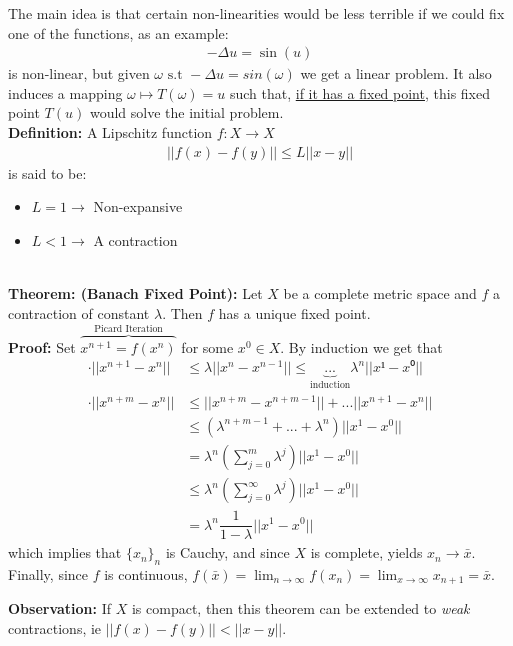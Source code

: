 The main idea is that certain non-linearities would be less terrible if we could fix one of the functions, as an example:
\begin{align}
    -\Delta u = \sin (u)
\end{align}
is non-linear, but given $\omega \text{ s.t } -\Delta u = sin(\omega)$ we get a linear problem. It also induces a mapping $\omega \mapsto T(\omega) = u$ such that, \underline{if it has a fixed point}, this fixed point $T(u)$ would solve the initial problem. \\


\textbf{Definition:} A Lipschitz function $f:X\to X$
\begin{align*}
    ||f(x)-f(y)||\leq L||x-y||
\end{align*}
is said to be:
\begin{itemize}
    \item $L = 1\to$ Non-expansive
    \item $L<1 \to$ A contraction
\end{itemize}\\

\textbf{Theorem: (Banach Fixed Point):} Let $X$ be a complete metric space and $f$ a contraction of constant $\lambda$. Then $f$ has a unique fixed point.\\

 

\textbf{Proof:} Set $\overbrace{x^{n+1}=f(x^n)}^{\text{Picard Iteration}}$ for some $x^0\in X$. By induction we get that
\begin{align*}
    \cdot ||x^{n+1}-x^n|| &\leq \lambda ||x^n-x^{n-1}||\leq \underbrace{...}_\text{induction} \lambda^n||x¹-x⁰||\\
    \cdot || x^{n+m}-x^n|| &\leq ||x^{n+m}-x^{n+m-1}||+ ... ||x^{n+1}-x^n||\\
    &\leq (\lambda ^{n+m-1}+...+\lambda^n)||x^1-x^0||\\
    &=\lambda^n\left(\displaystyle\sum_{j=0}^m\lambda^j\right)||x^1-x^0||\\
    &\leq\lambda^n\left(\displaystyle\sum_{j=0}^\infty\lambda^j\right)||x^1-x^0||\\
    &=\lambda^n\dfrac{1}{1-\lambda}||x^1-x^0||
\end{align*}
which implies that $\{x_n\}_n$ is Cauchy, and since $X$ is complete, yields $x_n\to \bar{x}$. Finally, since $f$ is continuous, $f(\bar{x}) = \lim_{n\to \infty}f(x_n) = \lim_{x\to\infty}x_{n+1}=\bar{x}$.

\textbf{Observation:} If $X$ is compact, then this theorem can be extended to \textit{weak} contractions, ie $||f(x)-f(y)||< ||x-y||$.\\

